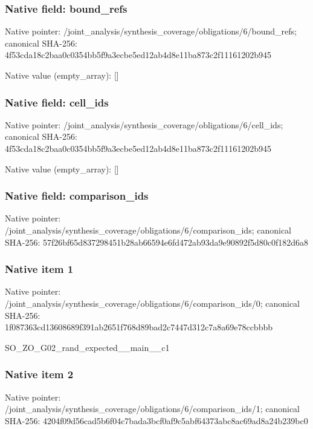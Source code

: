 \documentclass[10pt,a4paper]{article}
\begin{document}
\subsubsection{Native field: bound\_\allowbreak{}refs}
Native pointer: /joint\_\allowbreak{}analysis/synthesis\_\allowbreak{}coverage/obligations/6/bound\_\allowbreak{}refs; canonical SHA-256: 4f53cda18c2baa0c0354bb5f9a3ecbe5ed12ab4d8e11ba873c2f11161202b945

Native value (empty\_\allowbreak{}array): []

\subsubsection{Native field: cell\_\allowbreak{}ids}
Native pointer: /joint\_\allowbreak{}analysis/synthesis\_\allowbreak{}coverage/obligations/6/cell\_\allowbreak{}ids; canonical SHA-256: 4f53cda18c2baa0c0354bb5f9a3ecbe5ed12ab4d8e11ba873c2f11161202b945

Native value (empty\_\allowbreak{}array): []

\subsubsection{Native field: comparison\_\allowbreak{}ids}
Native pointer: /joint\_\allowbreak{}analysis/synthesis\_\allowbreak{}coverage/obligations/6/comparison\_\allowbreak{}ids; canonical SHA-256: 57f26bf65d837298451b28ab66594e6fd472ab93da9e90892f5d80c0f182d6a8

\subsubsection{Native item 1}
Native pointer: /joint\_\allowbreak{}analysis/synthesis\_\allowbreak{}coverage/obligations/6/comparison\_\allowbreak{}ids/0; canonical SHA-256: 1f087363cd13608689f391ab2651f768d89bad2c7447d312c7a8a69e78ccbbbb

\begingroup\raggedright\sloppy SO\_\allowbreak{}ZO\_\allowbreak{}G02\_\allowbreak{}rand\_\allowbreak{}expected\_\allowbreak{}\_\allowbreak{}main\_\allowbreak{}\_\allowbreak{}c1\par\endgroup

\subsubsection{Native item 2}
Native pointer: /joint\_\allowbreak{}analysis/synthesis\_\allowbreak{}coverage/obligations/6/comparison\_\allowbreak{}ids/1; canonical SHA-256: 4204f09d56cad5b6f04c7bada3bcf0af9c5abf64373abc8ac69ad8a24b239bc0
\end{document}
